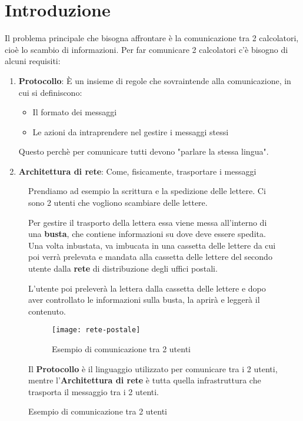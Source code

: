 \documentclass[a4paper]{article}
\begin{document}


\tableofcontents
\pagebreak

\section{Introduzione}
Il problema principale che bisogna affrontare è la comunicazione tra 2 calcolatori,
cioè lo scambio di informazioni. Per far comunicare 2 calcolatori c'è bisogno di
alcuni requisiti:
\begin{enumerate}
  \item \textbf{Protocollo}: È un insieme di regole che sovraintende alla comunicazione,
    in cui si definiscono:
    \begin{itemize}
      \item Il formato dei messaggi
      \item Le azioni da intraprendere nel gestire i messaggi stessi
    \end{itemize}
    Questo perchè per comunicare tutti devono "parlare la stessa lingua".

  \item \textbf{Architettura di rete}: Come, fisicamente, trasportare i messaggi
\end{enumerate}

\begin{figure}[H]
  \begin{example}
    Prendiamo ad esempio la scrittura e la spedizione delle lettere. Ci sono 2
    utenti che vogliono scambiare delle lettere.
    
    Per gestire il trasporto della
    lettera essa viene messa all'interno di una \textbf{busta}, che contiene informazioni
    su dove deve essere spedita. Una volta inbustata, va imbucata in una cassetta 
    delle lettere da cui poi verrà prelevata e mandata alla cassetta delle lettere 
    del secondo utente dalla \textbf{rete} di distribuzione degli uffici postali.

    L'utente poi preleverà la lettera dalla cassetta delle lettere e dopo aver
    controllato le informazioni sulla busta, la aprirà e leggerà il contenuto.
    \begin{figure}[H]
      \centering
      \texttt{[image: rete-postale]}
      \caption{Esempio di comunicazione tra 2 utenti}
    \end{figure}

    Il \textbf{Protocollo} è il linguaggio utilizzato per comunicare tra i 2
    utenti, mentre l'\textbf{Architettura di rete} è tutta quella infrastruttura
    che trasporta il messaggio tra i 2 utenti.
  \end{example}
\end{figure}
\end{document}
